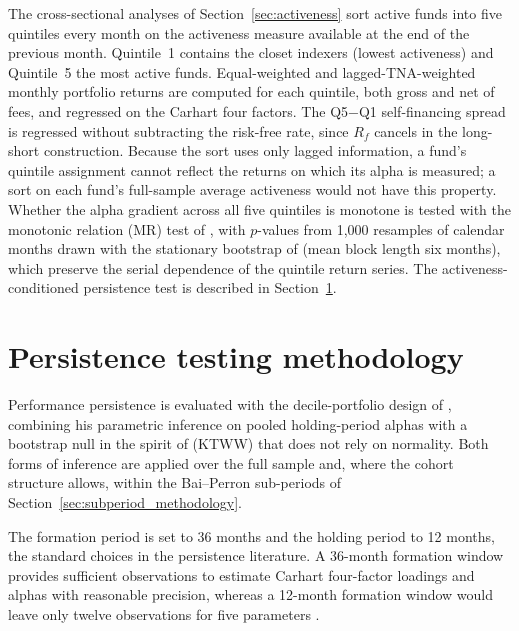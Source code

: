 \documentclass[12pt, oneside]{report}
\begin{document}
The cross-sectional analyses of Section~\ref{sec:activeness} sort
active funds into five quintiles every month on the activeness
measure available at the end of the previous month. Quintile~1
contains the closet indexers (lowest activeness) and Quintile~5 the
most active funds. Equal-weighted and lagged-TNA-weighted monthly
portfolio returns are computed for each quintile, both gross and net of
fees, and regressed on the Carhart four factors. The Q5$-$Q1
self-financing spread is regressed without subtracting the risk-free
rate, since $R_f$ cancels in the long-short construction. Because the
sort uses only lagged information, a fund's quintile assignment cannot
reflect the returns on which its alpha is measured; a sort on each fund's
full-sample average activeness would not have this property. Whether the
alpha gradient across all five quintiles is monotone is tested with the
monotonic relation (MR) test of \textcite{PattonTimmermann2010}, with
$p$-values from 1{,}000 resamples of calendar months drawn with the
stationary bootstrap of \textcite{PolitisRomano1994} (mean block length
six months), which preserve
the serial dependence of the quintile return series. The
activeness-conditioned persistence test is described in
Section~\ref{sec:persistence_design}.

\section{Persistence testing methodology}
\label{sec:persistence_design}

\noindent Performance persistence is evaluated with the decile-portfolio
design of \textcite{Carhart1997}, combining his parametric inference on
pooled holding-period alphas with a bootstrap null in the spirit of
\textcite{KosowskiTimmermannWermersWhite2006} (KTWW) that does not rely on
normality. Both forms of inference are applied over the full sample and,
where the cohort structure allows, within the Bai--Perron sub-periods of
Section~\ref{sec:subperiod_methodology}.

The formation period is set to 36 months and the holding period to 12
months, the standard choices in the persistence literature. A 36-month
formation window provides sufficient observations to estimate Carhart
four-factor loadings and alphas with reasonable precision, whereas a
12-month formation window would leave only twelve observations for five
parameters \parencite{Carhart1997,BollenBusse2005}.
\end{document}
